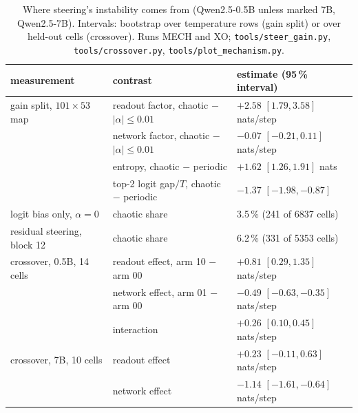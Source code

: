 \begin{table}[!htb]
\centering\small
\begin{tabular}{lll}
\toprule
measurement & contrast & estimate (95\,\% interval) \\
\midrule
gain split, $101\times53$ map & readout factor, chaotic $-$ $|\alpha|\le0.01$ & $+2.58$ $[1.79,3.58]$ nats/step \\
 & network factor, chaotic $-$ $|\alpha|\le0.01$ & $-0.07$ $[-0.21,0.11]$ nats/step \\
 & entropy, chaotic $-$ periodic & $+1.62$ $[1.26,1.91]$ nats \\
 & top-2 logit gap$/T$, chaotic $-$ periodic & $-1.37$ $[-1.98,-0.87]$ \\
logit bias only, $\alpha=0$ & chaotic share & 3.5\,\% (241 of 6837 cells) \\
residual steering, block 12 & chaotic share & 6.2\,\% (331 of 5353 cells) \\
crossover, 0.5B, 14 cells & readout effect, arm 10 $-$ arm 00 & $+0.81$ $[0.29,1.35]$ nats/step \\
 & network effect, arm 01 $-$ arm 00 & $-0.49$ $[-0.63,-0.35]$ nats/step \\
 & interaction & $+0.26$ $[0.10,0.45]$ nats/step \\
crossover, 7B, 10 cells & readout effect & $+0.23$ $[-0.11,0.63]$ nats/step \\
 & network effect & $-1.14$ $[-1.61,-0.64]$ nats/step \\
\bottomrule
\end{tabular}
\caption{Where steering's instability comes from (Qwen2.5-0.5B unless marked 7B, Qwen2.5-7B). Intervals: bootstrap over
temperature rows (gain split) or over held-out cells (crossover). Runs MECH and XO; \texttt{tools/steer\_gain.py}, \texttt{tools/crossover.py},
\texttt{tools/plot\_mechanism.py}.}
\label{tab:mechanism}
\end{table}

